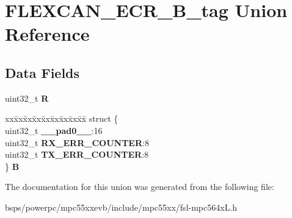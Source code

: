 \hypertarget{unionFLEXCAN__ECR__32B__tag}{}\section{F\+L\+E\+X\+C\+A\+N\+\_\+\+E\+C\+R\+\_\+B\+\_\+tag Union Reference}
\label{unionFLEXCAN__ECR__32B__tag}
\subsection*{Data Fields}
\begin{DoxyCompactItemize}
\item 
\mbox{\label{unionFLEXCAN__ECR__32B__tag_a48ea324b31e460584e74492972a7f09e}} 
uint32\+\_\+t {\bfseries R}
\item 
\mbox{\label{unionFLEXCAN__ECR__32B__tag_a0ce32c2670da271454843ba979f69051}} 
\begin{tabbing}
xx\=xx\=xx\=xx\=xx\=xx\=xx\=xx\=xx\=\kill
struct \{\\
\>uint32\_t {\bfseries \_\_pad0\_\_}:16\\
\>uint32\_t {\bfseries RX\_ERR\_COUNTER}:8\\
\>uint32\_t {\bfseries TX\_ERR\_COUNTER}:8\\
\} {\bfseries B}\\

\end{tabbing}\end{DoxyCompactItemize}


The documentation for this union was generated from the following file\+:\begin{DoxyCompactItemize}
\item 
bsps/powerpc/mpc55xxevb/include/mpc55xx/fsl-\/mpc564x\+L.\+h\end{DoxyCompactItemize}
